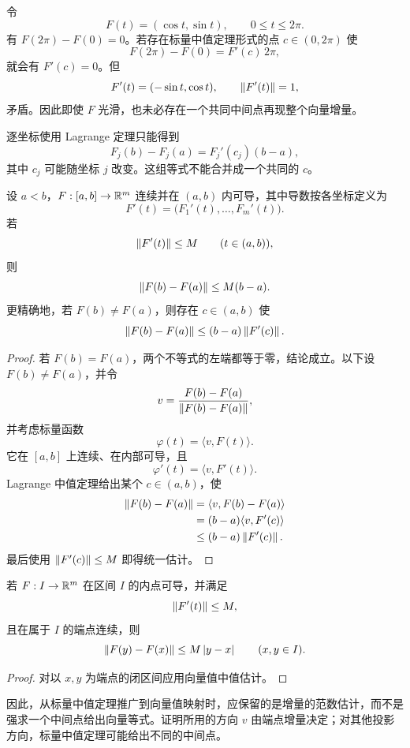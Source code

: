 \begin{counterexample}[不存在一般的向量等式]
\label{ex:vector-mvt-failure}
令
\[
 F(t)=(\cos t,\sin t),
\qquad 0\le t\le2\pi.
\]
有 \(F(2\pi)-F(0)=0\)。若存在标量中值定理形式的点 \(c\in(0,2\pi)\) 使
\[
 F(2\pi)-F(0)=F'(c)\,2\pi,
\]
就会有 \(F'(c)=0\)。但
\[
 F'(t)=(-\sin t,\cos t),\qquad \left\lVert F'(t)\right\rVert=1,
\]
矛盾。因此即使 \(F\) 光滑，也未必存在一个共同中间点再现整个向量增量。
\end{counterexample}

逐坐标使用 Lagrange 定理只能得到
\[
 F_j(b)-F_j(a)=F_j'(c_j)(b-a),
\]
其中 \(c_j\) 可能随坐标 \(j\) 改变。这组等式不能合并成一个共同的 \(c\)。

\begin{theorem}[向量值中值估计]
\label{thm:vector-mean-value-estimate}
设 \(a<b\)，\(F:[a,b]\to\mathbb{R}^m\) 连续并在 \((a,b)\) 内可导，其中导数按各坐标定义为
\[
 F'(t)=\bigl(F_1'(t),\ldots,F_m'(t)\bigr).
\]
若
\[
 \left\lVert F'(t)\right\rVert\le M\qquad(t\in(a,b)),
\]
则
\[
 \left\lVert F(b)-F(a)\right\rVert\le M(b-a).
\]
更精确地，若 \(F(b)\ne F(a)\)，则存在 \(c\in(a,b)\) 使
\[
 \left\lVert F(b)-F(a)\right\rVert
 \le (b-a)\left\lVert F'(c)\right\rVert.
\]
\end{theorem}

\begin{proof}
若 \(F(b)=F(a)\)，两个不等式的左端都等于零，结论成立。以下设 \(F(b)\ne F(a)\)，并令
\[
 v=\frac{F(b)-F(a)}{\left\lVert F(b)-F(a)\right\rVert},
\]
并考虑标量函数
\[
 \varphi(t)=\langle v,F(t)\rangle.
\]
它在 \([a,b]\) 上连续、在内部可导，且
\[
 \varphi'(t)=\langle v,F'(t)\rangle.
\]
Lagrange 中值定理给出某个 \(c\in(a,b)\)，使
\begin{align*}
 \left\lVert F(b)-F(a)\right\rVert
 &=\langle v,F(b)-F(a)\rangle\\
 &=(b-a)\langle v,F'(c)\rangle\\
 &\le(b-a)\left\lVert F'(c)\right\rVert.
\end{align*}
最后使用 \(\left\lVert F'(c)\right\rVert\le M\) 即得统一估计。
\end{proof}

\begin{corollary}
若 \(F:I\to\mathbb{R}^m\) 在区间 \(I\) 的内点可导，并满足
\[
 \left\lVert F'(t)\right\rVert\le M,
\]
且在属于 \(I\) 的端点连续，则
\[
 \left\lVert F(y)-F(x)\right\rVert\le M\left|y-x\right|
\qquad(x,y\in I).
\]
\end{corollary}

\begin{proof}
对以 \(x,y\) 为端点的闭区间应用向量值中值估计。
\end{proof}

因此，从标量中值定理推广到向量值映射时，应保留的是增量的范数估计，而不是强求一个中间点给出向量等式。证明所用的方向 \(v\) 由端点增量决定；对其他投影方向，标量中值定理可能给出不同的中间点。

